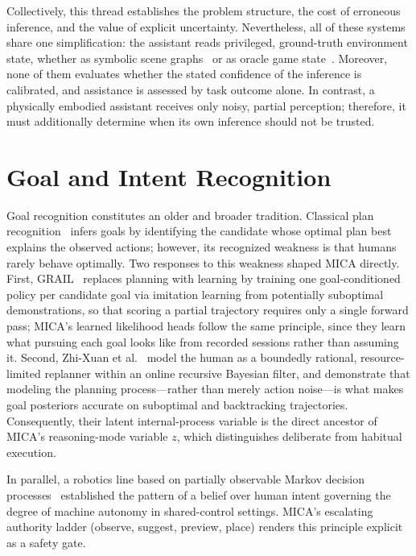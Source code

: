 \documentclass[12pt]{article}
\begin{document}
Collectively, this thread establishes the problem structure, the cost of
erroneous inference, and the value of explicit uncertainty. Nevertheless, all of
these systems share one simplification: the assistant reads privileged,
ground-truth environment state, whether as symbolic scene graphs~\cite{wah,nopa}
or as oracle game state~\cite{assistancezero}. Moreover, none of them evaluates
whether the stated confidence of the inference is calibrated, and assistance is
assessed by task outcome alone. In contrast, a physically embodied assistant
receives only noisy, partial perception; therefore, it must additionally
determine when its own inference should not be trusted.

\section{Goal and Intent Recognition}

Goal recognition constitutes an older and broader tradition. Classical plan
recognition~\cite{grdsurvey,vered} infers goals by identifying the candidate
whose optimal plan best explains the observed actions; however, its recognized
weakness is that humans rarely behave optimally. Two responses to this weakness
shaped MICA directly. First, GRAIL~\cite{grail} replaces planning with learning
by training one goal-conditioned policy per candidate goal via imitation
learning from potentially suboptimal demonstrations, so that scoring a partial
trajectory requires only a single forward pass; MICA's learned likelihood heads
follow the same principle, since they learn what pursuing each goal looks like
from recorded sessions rather than assuming it. Second, Zhi-Xuan et
al.~\cite{sips} model the human as a boundedly rational, resource-limited
replanner within an online recursive Bayesian filter, and demonstrate that
modeling the planning process---rather than merely action noise---is what makes
goal posteriors accurate on suboptimal and backtracking trajectories.
Consequently, their latent internal-process variable is the direct ancestor of
MICA's reasoning-mode variable $z$, which distinguishes deliberate from habitual
execution.

In parallel, a robotics line based on partially observable Markov decision
processes~\cite{apomdp,saborio,jain,gaze} established the pattern of a belief
over human intent governing the degree of machine autonomy in shared-control
settings. MICA's escalating authority ladder (observe, suggest, preview, place)
renders this principle explicit as a safety gate.
\end{document}
